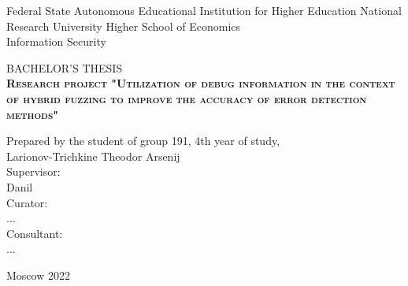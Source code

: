 \begin{titlepage}
    \newpage

    {
        \begin{center}
            Federal State Autonomous Educational Institution for Higher Education
            National Research University Higher School of Economics
            \\
            \bigskip
            Information Security \\
        \end{center}
    }

    \vspace{8em}

    \begin{center}
        {\Large BACHELOR'S THESIS}\\
        \textsc{\textbf{
                Research project
                \linebreak
                "Utilization of debug information in the context of hybrid fuzzing to improve the accuracy of error detection methods"}}
    \end{center}

    \vspace{4em}

    {
        \hfill\parbox{16cm}{
            \hspace*{5cm}\hspace*{-5cm}Prepared by the student of group 191, 4th year of study,\\
            Larionov-Trichkine Theodor Arsenij\\

            \hspace*{5cm}\hspace*{-5cm}Supervisor:\\
            Danil
            \\

            \hspace*{5cm}\hspace*{-5cm}Curator:\\
            ...\\

            \hspace*{5cm}\hspace*{-5cm}Consultant:\\
            ...\\
        }
    }

    \vspace{\fill}

    \begin{center}
        Moscow 2022
    \end{center}

\end{titlepage}
